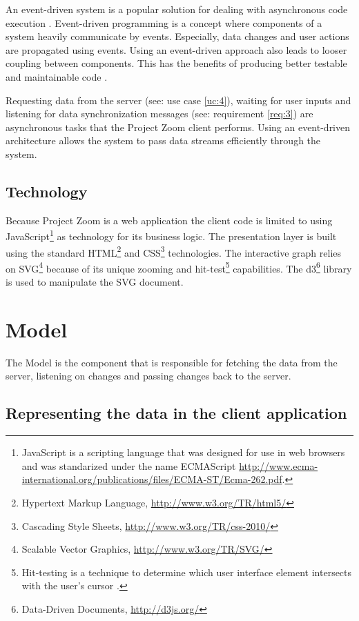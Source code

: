 An event-driven system is a popular solution for dealing with asynchronous code execution \cite{Michelson_2006}. Event-driven programming is a concept where components of a system heavily communicate by events. Especially, data changes and user actions are propagated using events. Using an event-driven approach also leads to looser coupling between components. This has the benefits of producing better testable and maintainable code \cite{Faison_2011}. 

Requesting data from the server (see: use case \ref{uc:4}), waiting for user inputs and listening for data synchronization messages (see: requirement \ref{req:3}) are asynchronous tasks that the Project Zoom client performs. Using an event-driven architecture allows the system to pass data streams efficiently through the system.


\subsection{Technology}
Because Project Zoom is a web application the client code is limited to using JavaScript\footnote{JavaScript is a scripting language that was designed for use in web browsers and was standarized under the name ECMAScript \url{http://www.ecma-international.org/publications/files/ECMA-ST/Ecma-262.pdf}.} as technology for its business logic. The presentation layer is built using the standard HTML\footnote{Hypertext Markup Language, \url{http://www.w3.org/TR/html5/}} and CSS\footnote{Cascading Style Sheets, \url{http://www.w3.org/TR/css-2010/}} technologies. The interactive graph relies on SVG\footnote{Scalable Vector Graphics, \url{http://www.w3.org/TR/SVG/}} because of its unique zooming and hit-test\footnote{Hit-testing is a technique to determine which user interface element intersects with the user's cursor \cite{Foley_1995}.} capabilities. The d3\footnote{Data-Driven Documents, \url{http://d3js.org/}} library is used to manipulate the SVG document.

\section{Model}

The Model is the component that is responsible for fetching the data from the server, listening on changes and passing changes back to the server.

\subsection{Representing the data in the client application}

